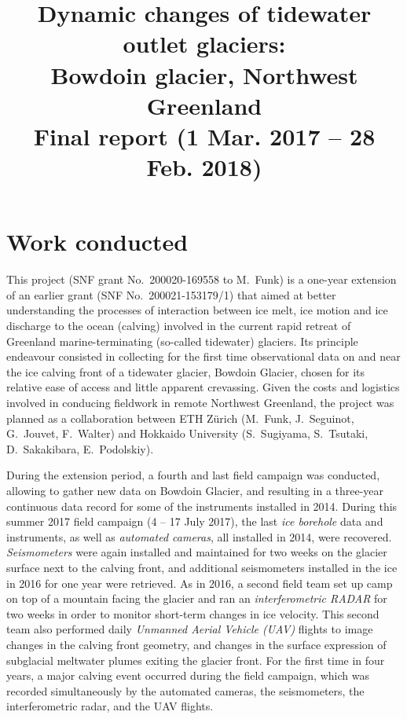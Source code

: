 \documentclass{article}
\title{\vspace{-2ex}
       Dynamic changes of tidewater outlet glaciers:\\
       Bowdoin glacier, Northwest Greenland\\\bigskip
       \large Final report (1 Mar. 2017 -- 28 Feb. 2018)}
\author{}
\date{}
\begin{document}

\maketitle

\section{Work conducted}

    This project (SNF grant No.~200020-169558 to M.~Funk) is a one-year
    extension of an earlier grant (SNF No.~200021-153179/1) that aimed at
    better understanding the processes of interaction between ice melt, ice
    motion and ice discharge to the ocean (calving) involved in the current
    rapid retreat of Greenland marine-terminating (so-called tidewater)
    glaciers. Its principle endeavour consisted in collecting for the first
    time observational data on and near the ice calving front of a tidewater
    glacier, Bowdoin Glacier, chosen for its relative ease of access and little
    apparent crevassing. Given the costs and logistics involved in conducing
    fieldwork in remote Northwest Greenland, the project was planned as a
    collaboration between ETH Zürich (M.~Funk, J.~Seguinot, G.~Jouvet,
    F.~Walter) and Hokkaido University (S.~Sugiyama, S.~Tsutaki, D.~Sakakibara,
    E.~Podolskiy).

    During the extension period, a fourth and last field campaign was
    conducted, allowing to gather new data on Bowdoin Glacier, and resulting in
    a three-year continuous data record for some of the instruments installed
    in 2014. During this summer 2017 field campaign (4 -- 17 July 2017), the
    last \emph{ice borehole} data and instruments, as well as \emph{automated
    cameras}, all installed in 2014, were recovered. \emph{Seismometers} were
    again installed and maintained for two weeks on the glacier surface next to
    the calving front, and additional seismometers installed in the ice in 2016
    for one year were retrieved. As in 2016, a second field team set up camp on
    top of a mountain facing the glacier and ran an \emph{interferometric
    RADAR} for two weeks in order to monitor short-term changes in ice
    velocity. This second team also performed daily \emph{Unmanned Aerial
    Vehicle (UAV)} flights to image changes in the calving front geometry, and
    changes in the surface expression of subglacial meltwater plumes exiting
    the glacier front. For the first time in four years, a major calving event
    occurred during the field campaign, which was recorded simultaneously by
    the automated cameras, the seismometers, the interferometric radar, and the
    UAV flights.
\end{document}
